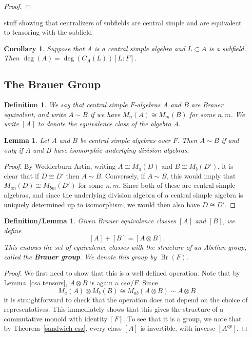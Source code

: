 \documentclass[12pt]{report}
\theoremstyle{plain}
\newtheorem{defn}[thm]{Definition}
\newtheorem{deflem}[thm]{Definition/Lemma}
\newtheorem{lem}[thm]{Lemma}
\newtheorem{cor}[thm]{Corollary}
\newcommand{\oper}[1]{\operatorname{#1}}
\newcommand{\Br}{\oper{Br}}
\newcommand{\Xb}[1]{\textbf{#1}\index{#1}}
\newcommand{\todo}[1]{\textcolor{todo}{#1}}
\begin{document}
\begin{proof}
\end{proof}

\todo{stuff showing that centralizers of subfields are central simple and
are equivalent to tensoring with the subfield}

\begin{cor} \label{corollary-degree-of-centralizer-of-a-subfield-of-a-csa}
Suppose that $A$ is a central simple algebra and $L \subset A$ is a
subfield. Then $\deg(A) = \deg(C_A(L)) [L:F]$.
\end{cor}

\subsection{The Brauer Group}

\begin{defn}
We say that central simple $F$-algebras $A$ and $B$ are Brauer equivalent,
and write $A \sim B$ if we have $M_n(A) \cong M_m(B)$ for some $n, m$. We
write $[A]$ to denote the equivalence class of the algebra $A$.
\end{defn}

\begin{lem} \label{breq division}
Let $A$ and $B$ be central simple algebras over $F$. Then $A \sim B$ if and
only if $A$ and $B$ have isomorphic underlying division algebras.
\end{lem}
\begin{proof}
By Wedderburn-Artin, writing $A \cong M_a(D)$ and $B \cong M_b(D')$, it is
clear that if $D \cong D'$ then $A \sim B$. Conversely, if $A \sim B$, this
would imply that $M_{an}(D) \cong M_{bm}(D')$ for some $n, m$. Since both
of these are central simple algebras, and since the underlying division
algebra of a central simple algebra is uniquely determined up to
isomorphism, we would then also have $D \cong D'$.
\end{proof}

\begin{deflem}
Given Brauer equivalence classes $[A]$ and $[B]$, we define
\[ [A] + [B] = [A \otimes B]. \]
This endows the set of equivalence classes with the structure of an Abelian
group, called the \Xb{Brauer group}. We denote this group by $\Br(F)$.
\end{deflem}
\begin{proof}
We first need to show that this is a well defined operation. Note that by
Lemma~\ref{csa tensors}, $A \otimes B$ is again a $csa/F$. 
Since 
\[ M_a(A) \otimes M_b(B) \cong M_{ab}(A \otimes B) \sim A \otimes B \]
it is straightforward to check that the operation does not depend on the
choice of representatives. This immediately shows that this gives the
structure of a commutative monoid with identity $[F]$. To see that it is a
group, we note that by Theorem~\ref{sandwich csa}, every class $[A]$ is
invertible, with inverse $[A^{op}]$.
\end{proof}
\end{document}
